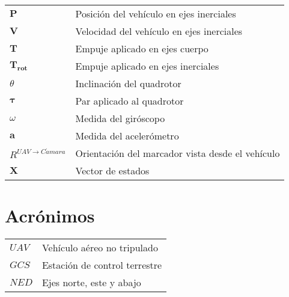 \chapter*{\notationname}
\pagestyle{especial}
\chaptermark{\notationname}
{}
\begin{longtable}{p{3cm}p{8.5cm}}
$\bm{P}$ & Posición del vehículo en ejes inerciales  \\
$\bm{V}$ & Velocidad del vehículo en ejes inerciales \\
$\bm{T}$ & Empuje aplicado en ejes cuerpo \\
$\bm{T_{rot}}$ & Empuje aplicado en ejes inerciales \\
$\theta$ &  Inclinación del quadrotor \\
$\bm{\tau}$ &  Par aplicado al quadrotor \\
$\omega$ & Medida del giróscopo \\
$\bm{a}$ & Medida del acelerómetro \\
$R^{UAV\rightarrow C\acute{a}mara}$  & Orientación del marcador vista desde el vehículo\\
$\bm{X}$ &  Vector de estados \\
\end{longtable}
\newpage

\chapter*{Acrónimos}
\pagestyle{especial}
{}
\begin{longtable}{p{3cm}p{8.5cm}}
$UAV$ & Vehículo aéreo no tripulado\\
$GCS$ & Estación de control terrestre \\
$NED$ & Ejes norte, este y abajo \\
\end{longtable}
\newpage

